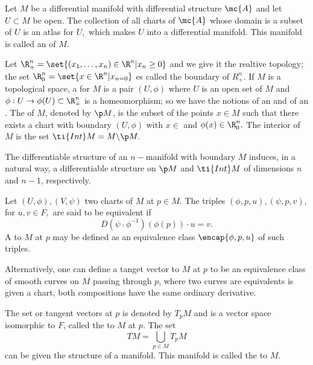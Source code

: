 \begin{defn}
   \label{marathe_defn-1.3}
Let $M$ be a differential manifold with differential structure $\mc{A}$ and let $U\subset M$ be open. The collection of all charts of $\mc{A}$ whose domain is a subset of $U$ is an atlas for $U,$ which makes $U$ into a differential manifold. This manifold is called an  of $M$.
\end{defn}

Let $\R^{n}_{+}=\set{(x_{1}, \dots, x_{n})\in \R^{n}| x_{n} \geq 0}$ and we give it the realtive topology; the set $\R_{0}^{n}=\set{x\in \R^{n}| x_{n=0}}$ es called the boundary of $R^{n}_{+}.$ If $M$ is a topological space, a  for $M$ is a pair $(U, \phi)$ where $U$ is an open set of $M$ and $\phi:U\to \phi(U) \subset \R^{n}_{+}$ is a homeomorphism; so we have the notions of an  and of an . The  of $M$, denoted by $\p M$, is the subset of the points $x \in M$ such that there exists a chart with boundary $(U, \phi)$ with $x\in $ and $\phi(x)\in \R^{n}_{0}.$ The interior of $M$ is the set $\ti{Int}M = M \backslash \p M.$

\begin{rem}
 The differentiable structure of an $n-$manifold with boundary $M$ induces, in a natural way, a differentiable structure on $\p M$ and $\ti{Int} M$ of dimensions $n$ and $n-1$, respectively.
\end{rem}

Let $(U, \phi), (V, \psi)$ two charts of $M$ at $p\in M.$ The triples $(\phi, p, u), (\psi, p, v),$ for $u,v \in F,$ are said to be equivalent if 
$$
D(\psi \comp \phi^{-1})(\phi(p))\cdot u = v.
$$
A  to $M$ at $p$ may be defined as an equivalence class $\encap{\phi, p, u}$ of such triples.

Alternatively, one can define a tanget vector to $M$ at $p$ to be an equivalence class of smooth curves on $M$ passing through $p$, where two curves are equivalents is given a chart, both compositions have the same ordinary derivative. 

The set or tangent vectors at $p$ is denoted by $T_{p}M$ and is a vector space isomorphic to $F$, called the  to $M$ at $p.$ The set
\[TM=\bigcup_{p\in M}T_{p}M\]
can be given the structure of a manifold. This manifold is called the  to $M$.